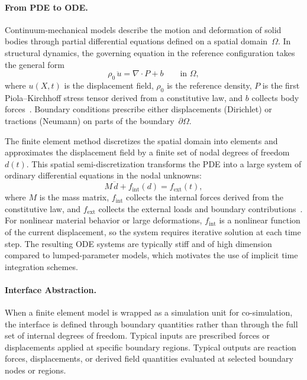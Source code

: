 \paragraph{From PDE to ODE.}
Continuum-mechanical models describe the motion and deformation of solid bodies through partial differential equations defined on a spatial domain~$\Omega$.
In structural dynamics, the governing equation in the reference configuration takes the general form
\begin{equation}
    \rho_0\,\ddot{u}
    = \nabla \cdot P + b
    \qquad \text{in } \Omega,
    \label{eq:continuum_balance}
\end{equation}
where $u(X,t)$ is the displacement field, $\rho_0$ is the reference density, $P$ is the first Piola--Kirchhoff stress tensor derived from a constitutive law, and $b$ collects body forces~\cite{knothe_finite_2017}.
Boundary conditions prescribe either displacements (Dirichlet) or tractions (Neumann) on parts of the boundary~$\partial\Omega$.

The finite element method discretizes the spatial domain into elements and approximates the displacement field by a finite set of nodal degrees of freedom~$d(t)$.
This spatial semi-discretization transforms the PDE into a large system of ordinary differential equations in the nodal unknowns:
\begin{equation}
    M\,\ddot{d} + f_{\mathrm{int}}(d) = f_{\mathrm{ext}}(t),
    \label{eq:fem_semidiscrete}
\end{equation}
where $M$ is the mass matrix, $f_{\mathrm{int}}$ collects the internal forces derived from the constitutive law, and $f_{\mathrm{ext}}$ collects the external loads and boundary contributions~\cite{knothe_finite_2017}.
For nonlinear material behavior or large deformations, $f_{\mathrm{int}}$ is a nonlinear function of the current displacement, so the system requires iterative solution at each time step.
The resulting ODE systems are typically stiff and of high dimension compared to lumped-parameter models, which motivates the use of implicit time integration schemes.

\paragraph{Interface Abstraction.}
When a finite element model is wrapped as a simulation unit for co-simulation, the interface is defined through boundary quantities rather than through the full set of internal degrees of freedom.
Typical inputs are prescribed forces or displacements applied at specific boundary regions.
Typical outputs are reaction forces, displacements, or derived field quantities evaluated at selected boundary nodes or regions.

